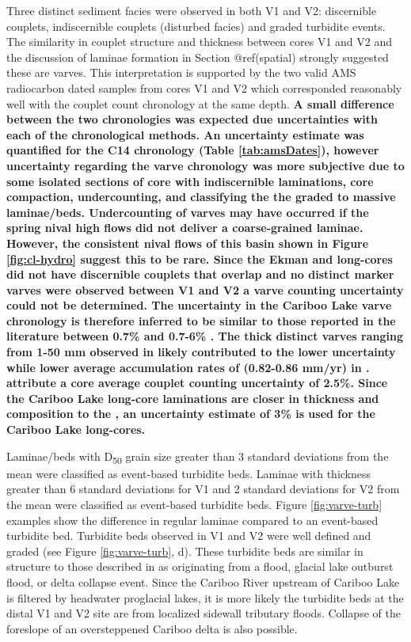 \documentclass[Royal,times,doublespace,sageh]{sagej}
\begin{document}
Three distinct sediment facies were observed in both V1 and V2:
discernible couplets, indiscernible couplets (disturbed facies) and
graded turbidite events. The similarity in couplet structure and
thickness between cores V1 and V2 and the discussion of laminae
formation in Section @ref(spatial) strongly suggested these are varves.
This interpretation is supported by the two valid AMS radiocarbon dated
samples from cores V1 and V2 which corresponded reasonably well with the
couplet count chronology at the same depth. \textbf{A small difference
between the two chronologies was expected due uncertainties with each of
the chronological methods. An uncertainty estimate was quantified for
the C14 chronology (Table \ref{tab:amsDates}), however uncertainty
regarding the varve chronology was more subjective due to some isolated
sections of core with indiscernible laminations, core compaction,
undercounting, and classifying the the graded to massive laminae/beds.
Undercounting of varves may have occurred if the spring nival high flows
did not deliver a coarse-grained laminae. However, the consistent nival
flows of this basin shown in Figure \ref{fig:cl-hydro} suggest this to
be rare. Since the Ekman and long-cores did not have discernible
couplets that overlap and no distinct marker varves were observed
between V1 and V2 a varve counting uncertainty could not be determined.
The uncertainty in the Cariboo Lake varve chronology is therefore
inferred to be similar to those reported in the literature between 0.7\%
\citep{Menounos2008c} and 0.7-6\% \citep{Birlo2022}. The thick distinct
varves ranging from 1-50 mm observed in \citet{Menounos2008c} likely
contributed to the lower uncertainty while lower average accumulation
rates of (0.82-0.86 mm/yr) in \citep{Birlo2022}. \citet{Birlo2022}
attribute a core average couplet counting uncertainty of 2.5\%. Since
the Cariboo Lake long-core laminations are closer in thickness and
composition to the \citet{Birlo2022}, an uncertainty estimate of 3\% is
used for the Cariboo Lake long-cores.}

Laminae/beds with D\textsubscript{50} grain size greater than 3 standard
deviations from the mean were classified as event-based turbidite beds.
Laminae with thickness greater than 6 standard deviations for V1 and 2
standard deviations for V2 from the mean were classified as event-based
turbidite beds. Figure \ref{fig:varve-turb} examples show the difference
in regular laminae compared to an event-based turbidite bed. Turbidite
beds observed in V1 and V2 were well defined and graded (see Figure
\ref{fig:varve-turb}, d). These turbidite beds are similar in structure
to those described in \citet{sabatier2022} as originating from a flood,
glacial lake outburst flood, or delta collapse event. Since the Cariboo
River upstream of Cariboo Lake is filtered by headwater proglacial
lakes, it is more likely the turbidite beds at the distal V1 and V2 site
are from localized sidewall tributary floods. Collapse of the foreslope
of an oversteppened Cariboo delta is also possible.
\end{document}
